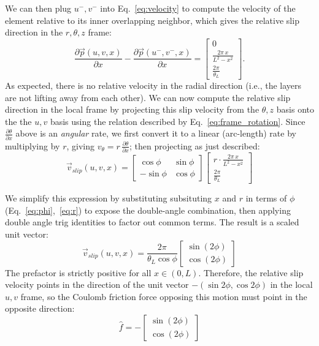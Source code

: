 \documentclass[11pt]{article}
\begin{document}
We can then plug $u^-,v^-$ into Eq.~\eqref{eq:velocity} to compute the velocity of the element relative to its inner overlapping neighbor, which gives the relative slip direction in the $r,\theta,z$ frame:
\begin{equation}
    \frac{\partial \vec{p}(u,v,x)}{\partial x} - \frac{\partial \vec{p}(u^-,v^-,x)}{\partial x} =
    \begin{bmatrix}
        0\\
        \frac{2\pi\,x}{L^2-x^2}\\
        \frac{2\pi}{\theta_L}
    \end{bmatrix}.
\end{equation}
As expected, there is no relative velocity in the radial direction (i.e., the layers are not lifting away from each other). We can now compute the relative slip direction in the local frame by projecting this slip velocity from the $\theta,z$ basis onto the the $u,v$ basis using the relation described by Eq.~\eqref{eq:frame_rotation}. Since $\frac{\partial\theta}{\partial x}$ above is an \emph{angular} rate, we first convert it to a linear (arc-length) rate by multiplying by $r$, giving $v_\theta = r\,\frac{\partial\theta}{\partial x}$; then projecting as just described:
\begin{equation}\label{eq:vslip_raw}
    \vec{v}_{slip}(u,v,x) = \begin{bmatrix}
        \cos\phi & \sin\phi \\
        -\sin\phi & \cos\phi
    \end{bmatrix}
    \begin{bmatrix}
        r\cdot\frac{2\pi\,x}{L^2-x^2}\\
        \frac{2\pi}{\theta_L}
    \end{bmatrix}
\end{equation}

We simplify this expression by substituting subsituting $x$ and $r$ in terms of $\phi$ (Eq.~\eqref{eq:phi},~\eqref{eq:r}) to expose the double-angle combination, then applying double angle trig identities to factor out common terms. The result is a scaled unit vector:
\begin{equation}
    \vec{v}_{slip}(u,v,x) = \frac{2\pi}{\theta_L\cos\phi} \begin{bmatrix} \sin(2\phi) \\ \cos(2\phi) \end{bmatrix}
\end{equation}
The prefactor is strictly positive for all $x \in (0,L)$. Therefore, the relative slip velocity points in the direction of the unit vector $-(\sin2\phi,\cos2\phi)$ in the local $u,v$ frame, so the Coulomb friction force opposing this motion must point in the opposite direction:
\begin{equation}\label{eq:friction_direction}
    \hat{f} = -\begin{bmatrix} \sin(2\phi) \\ \cos(2\phi) \end{bmatrix}
\end{equation}
\end{document}
